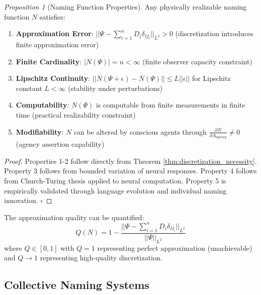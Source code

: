 \documentclass[12pt]{article}
\newtheorem{proposition}[theorem]{Proposition}
\theoremstyle{definition}
\theoremstyle{remark}
\newtheorem{proposition}[theorem]{Proposition}
\begin{document}
\begin{proposition}[Naming Function Properties]
\label{prop:naming_properties}
Any physically realizable naming function $N$ satisfies:
\begin{enumerate}
\item \textbf{Approximation Error}: $||\Psi - \sum_{i=1}^{n} D_i \delta_{\Omega_i}||_{L^2} > 0$ (discretization introduces finite approximation error)

\item \textbf{Finite Cardinality}: $|N(\Psi)| = n < \infty$ (finite observer capacity constraint)

\item \textbf{Lipschitz Continuity}: $||N(\Psi + \epsilon) - N(\Psi)|| \leq L||\epsilon||$ for Lipschitz constant $L < \infty$ (stability under perturbations)

\item \textbf{Computability}: $N(\Psi)$ is computable from finite measurements in finite time (practical realizability constraint)

\item \textbf{Modifiability}: $N$ can be altered by conscious agents through $\frac{\partial N}{\partial A_{agency}} \neq 0$ (agency assertion capability)
\end{enumerate}
\end{proposition}

\begin{proof}
Properties 1-2 follow directly from Theorem \ref{thm:discretization_necessity}. Property 3 follows from bounded variation of neural responses. Property 4 follows from Church-Turing thesis applied to neural computation. Property 5 is empirically validated through language evolution and individual naming innovation. $\square$
\end{proof}

The approximation quality can be quantified:
\begin{equation}
\label{eq:approximation_quality}
Q(N) = 1 - \frac{||\Psi - \sum_{i=1}^{n} D_i \delta_{\Omega_i}||_{L^2}}{||\Psi||_{L^2}}
\end{equation}
where $Q \in [0,1]$ with $Q = 1$ representing perfect approximation (unachievable) and $Q \rightarrow 1$ representing high-quality discretization.

\subsection{Collective Naming Systems}
\end{document}

